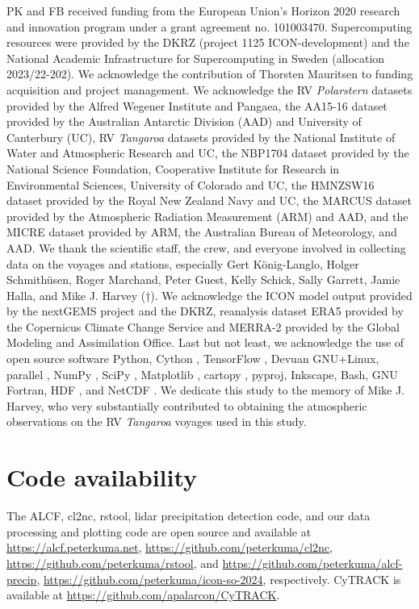\documentclass[12pt,a4paper]{article}
\begin{document}
PK and FB received funding from the European Union’s Horizon 2020 research and
innovation program under a grant agreement no. 101003470. Supercomputing
resources were provided by the DKRZ (project 1125 ICON-development) and the
National Academic Infrastructure for Supercomputing in Sweden (allocation
2023/22-202). We acknowledge the contribution of Thorsten Mauritsen to funding
acquisition and project management.  We acknowledge the RV \emph{Polarstern}
datasets provided by the Alfred Wegener Institute and Pangaea, the AA15-16
dataset provided by the Australian Antarctic Division (AAD) and University of
Canterbury (UC), RV \emph{Tangaroa} datasets provided by the National Institute
of Water and Atmospheric Research and UC, the NBP1704 dataset provided by the
National Science Foundation, Cooperative Institute for Research in
Environmental Sciences, University of Colorado and UC, the HMNZSW16 dataset
provided by the Royal New Zealand Navy and UC, the MARCUS dataset provided by
the Atmospheric Radiation Measurement (ARM) and AAD, and the MICRE dataset
provided by ARM, the Australian Bureau of Meteorology, and AAD. We thank the
scientific staff, the crew, and everyone involved in collecting data on the
voyages and stations, especially Gert König-Langlo, Holger Schmithüsen, Roger
Marchand, Peter Guest, Kelly Schick, Sally Garrett, Jamie Halla, and Mike J.
Harvey (†). We acknowledge the ICON model output provided by the nextGEMS
project and the DKRZ, reanalysis dataset ERA5 provided by the Copernicus
Climate Change Service and MERRA-2 provided by the Global Modeling and
Assimilation Office.  Last but not least, we acknowledge the use of open source
software Python, Cython \citep{behnel2011}, TensorFlow \citep{abadi2016},
Devuan GNU+Linux, parallel \citep{tange2011}, NumPy \citep{harris2020}, SciPy
\citep{virtanen2020}, Matplotlib \citep{hunter2007}, cartopy \citep{cartopy},
pyproj, Inkscape, Bash, GNU Fortran, HDF \citep{folk1999}, and NetCDF
\citep{rew1990}.  We dedicate this study to the memory of Mike J.  Harvey, who
very substantially contributed to obtaining the atmospheric observations on the
RV \emph{Tangaroa} voyages used in this study.

\section*{Code availability}

The ALCF, cl2nc, rstool, lidar precipitation detection code, and our data
processing and plotting code are open source and available at
\url{https://alcf.peterkuma.net}, \url{https://github.com/peterkuma/cl2nc},
\url{https://github.com/peterkuma/rstool}, and
\url{https://github.com/peterkuma/alcf-precip},
\url{https://github.com/peterkuma/icon-so-2024}, respectively. CyTRACK is
available at \url{https://github.com/apalarcon/CyTRACK}.
\end{document}
